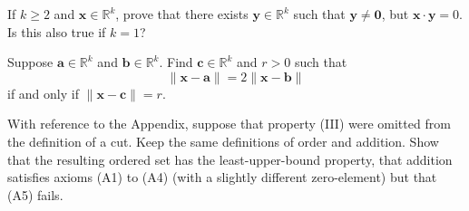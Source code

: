 \documentclass[12 pt, letterpaper]{hmcpset}
\begin{document}
\pagebreak

\begin{problem}[18.]
	If $k \ge 2$ and $\mathbf{x} \in \mathbb{R}^{k}$, prove that there exists $\mathbf{y} \in \mathbb{R}^{k}$ such that $\mathbf{y} \neq \mathbf{0}$, but $\mathbf{x} \cdot \mathbf{y} = 0$. Is this also true if $k = 1$?
\end{problem}

\pagebreak

\begin{problem}[19.]
	Suppose $\mathbf{a} \in \mathbb{R}^{k}$ and $\mathbf{b} \in \mathbb{R}^{k}$. Find $\mathbf{c} \in \mathbb{R}^{k}$ and $r > 0$ such that
	 \[
		\lVert \mathbf{x} - \mathbf{a} \rVert = 2 \lVert \mathbf{x} - \mathbf{b} \rVert
	\]
	if and only if $\lVert \mathbf{x} - \mathbf{c} \rVert = r$.
\end{problem}

\pagebreak

\begin{problem}[20.]
	With reference to the Appendix, suppose that property (III) were omitted from the definition of a cut. Keep the same definitions of order and addition. Show that the resulting ordered set has the least-upper-bound property, that addition satisfies axioms (A1) to (A4) (with a slightly different zero-element) but that (A5) fails.
\end{problem}
\end{document}

